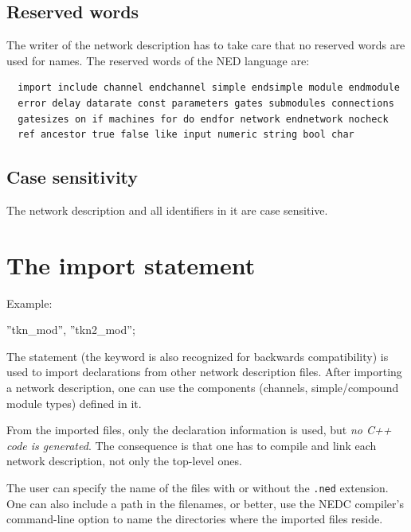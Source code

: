\subsection{Reserved words}


The writer of the network description has to take care that no 
reserved words are used for names. The reserved words of the 
NED language are:
\begin{verbatim}
  import include channel endchannel simple endsimple module endmodule
  error delay datarate const parameters gates submodules connections
  gatesizes on if machines for do endfor network endnetwork nocheck
  ref ancestor true false like input numeric string bool char
\end{verbatim}




\subsection{Case sensitivity}


The network description and all identifiers in it are case sensitive.



\section{The import statement}


Example:


 ''tkn\_mod'', ''tkn2\_mod'';


The  statement (the
 keyword is also recognized for
backwards compatibility) is used to import declarations from other
network description files. After importing a network description, one
can use the components (channels, simple/compound
module types) defined in it.


From the imported files, only the declaration information is used, but
\textit{no C++ code is generated}. The consequence is that one has to
compile and link each network description,
not only the top-level ones.


The user can specify the name of the files with or without the
\texttt{.ned} extension. One can also include a path in the
filenames, or better, use the NEDC compiler's
 command-line option to name the directories where the
imported files reside.





